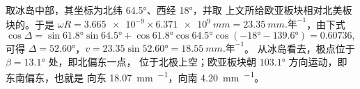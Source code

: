 \begin{example}[欧亚板块在冰岛远离北美板块]\label{ex:b1:plate-kinematics:iceland}
取冰岛中部，其坐标为北纬 \ang{64.5}、西经 \ang{18}，并取
上文所给欧亚板块相对北美板块的。于是 $\omega R =
\num{3.665e-9}\times\qty{6.371e9}{mm} = \qty{23.35}{mm.\text{年}^{-1}}$，由下式
\[
  \cos\Delta = \sin\ang{61.8}\sin\ang{64.5}
  + \cos\ang{61.8}\cos\ang{64.5}\cos(\ang{-18} - \ang{139.6}) = 0.60736,
\]
可得 $\Delta = \ang{52.60}$，$v = 23.35\sin\ang{52.60} = \qty{18.55}{mm.\text{年}^{-1}}$。
从冰岛看去，极点位于 $\beta = \ang{13.1}$ 处，即北偏东一点，
位于北极上空；欧亚板块朝 $\ang{103.1}$ 方向运动，即东南偏东，也就是
向东 \qty{18.07}{mm.^{-1}}，向南 \qty{4.20}{mm.^{-1}}。
\end{example}

